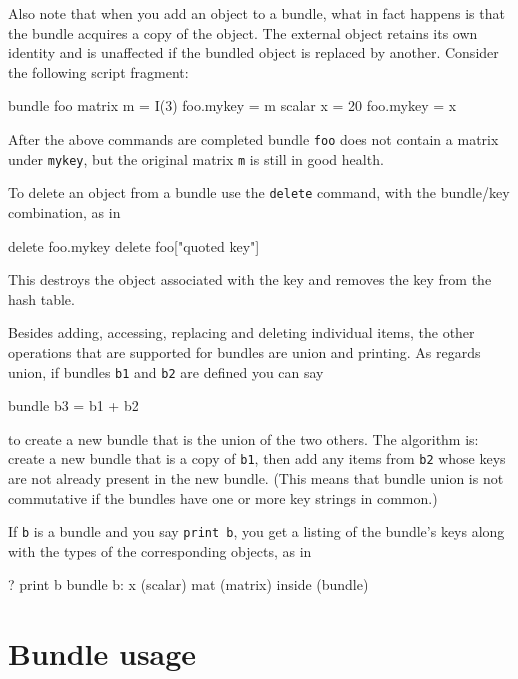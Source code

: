 Also note that when you add an object to a bundle, what in fact
happens is that the bundle acquires a copy of the object. The external
object retains its own identity and is unaffected if the bundled
object is replaced by another. Consider the following script fragment:

\begin{code}
bundle foo
matrix m = I(3)
foo.mykey = m
scalar x = 20
foo.mykey = x
\end{code}

After the above commands are completed bundle \texttt{foo} does not
contain a matrix under \texttt{mykey}, but the original matrix
\texttt{m} is still in good health.

To delete an object from a bundle use the \texttt{delete} command,
with the bundle/key combination, as in

\begin{code}
delete foo.mykey
delete foo["quoted key"]
\end{code}

This destroys the object associated with the key and removes the key
from the hash table.

Besides adding, accessing, replacing and deleting individual items,
the other operations that are supported for bundles are union and
printing. As regards union, if bundles \texttt{b1} and \texttt{b2} are
defined you can say

\begin{code}
bundle b3 = b1 + b2
\end{code}

to create a new bundle that is the union of the two others. The
algorithm is: create a new bundle that is a copy of \texttt{b1}, then
add any items from \texttt{b2} whose keys are not already present in
the new bundle. (This means that bundle union is not commutative if
the bundles have one or more key strings in common.)

If \texttt{b} is a bundle and you say \texttt{print b}, you get a
listing of the bundle's keys along with the types of the corresponding
objects, as in

\begin{code}
? print b
bundle b:
 x (scalar)
 mat (matrix)
 inside (bundle)
\end{code}

\section{Bundle usage}
\label{sec:bundle-usage}

